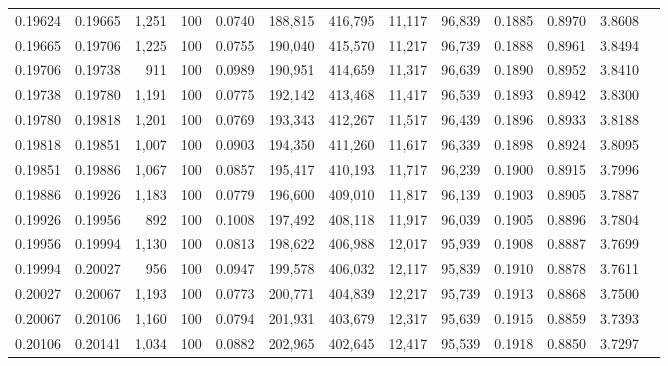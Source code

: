 \begin{tabular}{rrrrrrrrrrrrr}
0.19624 & 0.19665 & 1,251 & 100 &                                     0.0740 & 188,815 & 416,795 &  11,117 &  96,839 & 0.1885 & 0.8970 & 3.8608 \\
0.19665 & 0.19706 & 1,225 & 100 &                                     0.0755 & 190,040 & 415,570 &  11,217 &  96,739 & 0.1888 & 0.8961 & 3.8494 \\
0.19706 & 0.19738 &   911 & 100 &                                     0.0989 & 190,951 & 414,659 &  11,317 &  96,639 & 0.1890 & 0.8952 & 3.8410 \\
0.19738 & 0.19780 & 1,191 & 100 &                                     0.0775 & 192,142 & 413,468 &  11,417 &  96,539 & 0.1893 & 0.8942 & 3.8300 \\
0.19780 & 0.19818 & 1,201 & 100 &                                     0.0769 & 193,343 & 412,267 &  11,517 &  96,439 & 0.1896 & 0.8933 & 3.8188 \\
0.19818 & 0.19851 & 1,007 & 100 &                                     0.0903 & 194,350 & 411,260 &  11,617 &  96,339 & 0.1898 & 0.8924 & 3.8095 \\
0.19851 & 0.19886 & 1,067 & 100 &                                     0.0857 & 195,417 & 410,193 &  11,717 &  96,239 & 0.1900 & 0.8915 & 3.7996 \\
0.19886 & 0.19926 & 1,183 & 100 &                                     0.0779 & 196,600 & 409,010 &  11,817 &  96,139 & 0.1903 & 0.8905 & 3.7887 \\
0.19926 & 0.19956 &   892 & 100 &                                     0.1008 & 197,492 & 408,118 &  11,917 &  96,039 & 0.1905 & 0.8896 & 3.7804 \\
0.19956 & 0.19994 & 1,130 & 100 &                                     0.0813 & 198,622 & 406,988 &  12,017 &  95,939 & 0.1908 & 0.8887 & 3.7699 \\
0.19994 & 0.20027 &   956 & 100 &                                     0.0947 & 199,578 & 406,032 &  12,117 &  95,839 & 0.1910 & 0.8878 & 3.7611 \\
0.20027 & 0.20067 & 1,193 & 100 &                                     0.0773 & 200,771 & 404,839 &  12,217 &  95,739 & 0.1913 & 0.8868 & 3.7500 \\
0.20067 & 0.20106 & 1,160 & 100 &                                     0.0794 & 201,931 & 403,679 &  12,317 &  95,639 & 0.1915 & 0.8859 & 3.7393 \\
0.20106 & 0.20141 & 1,034 & 100 &                                     0.0882 & 202,965 & 402,645 &  12,417 &  95,539 & 0.1918 & 0.8850 & 3.7297 \\

\end{tabular}
